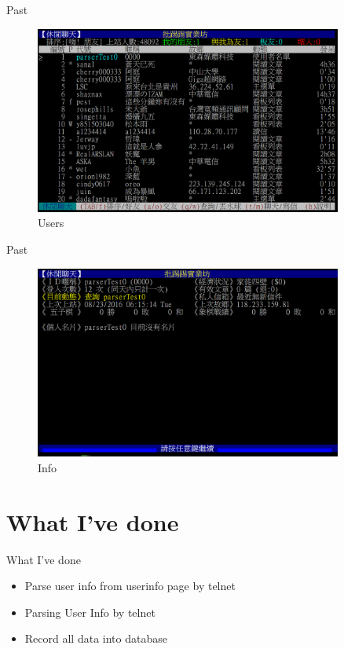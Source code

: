 \documentclass{beamer}
\begin{document}
\begin{frame} {Past}
\begin{figure}[t]
    \centering
    \includegraphics[width=0.9\textwidth]{figures/s3.png}
    \caption{Users}
\end{figure}
\end{frame}

\begin{frame} {Past}
\begin{figure}[t]
    \centering
    \includegraphics[width=0.9\textwidth]{figures/s4.png}
    \caption{Info}
\end{figure}
\end{frame}

\section{What I've done}
\begin{frame}{What I've done}
    \begin{itemize}
        \item {Parse user info from userinfo page by telnet}
        \item {Parsing User Info by telnet}
        \item {Record all data into database}
    \end{itemize}
\end{frame}
\end{document}
